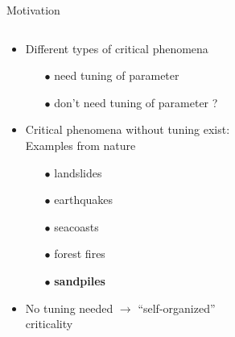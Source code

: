 \documentclass[xcolor=dvipsnames]{beamer}
\newcommand{\myitemsep}{\setlength\itemsep{0.33cm}}
\newcommand{\mysubitemsep}{\setlength\itemsep{0.22cm}}
\begin{document}
    \begin{frame}[t]{Motivation}
        \vspace{-1em}
        \begin{columns}[t]
            \begin{column}{0.6\linewidth}
                \begin{itemize}\myitemsep
                    \item<1-> Different types of critical phenomena
                        \begin{enumerate}\mysubitemsep
                            \item[$\bullet$] need tuning of parameter
                            \item[$\bullet$] don't need tuning of parameter \large ?
                        \end{enumerate}
                    \item<2-> Critical phenomena without tuning exist:\\
                          Examples from nature~\cite{Hergarten}
                            \begin{itemize}\mysubitemsep
                                \item[$\bullet$] landslides
                                \item[$\bullet$] earthquakes
                                \item[$\bullet$] seacoasts
                                \item[$\bullet$] forest fires
                                \item[$\bullet$] \textbf{sandpiles}
                            \end{itemize}
                    \item<4-> No tuning needed $\rightarrow$ \enquote{self-organized}\\
                              criticality
                \end{itemize}
            \end{column}
            \begin{column}{0.4\linewidth}
            \end{column}
        \end{columns}
    \end{frame}
\end{document}
